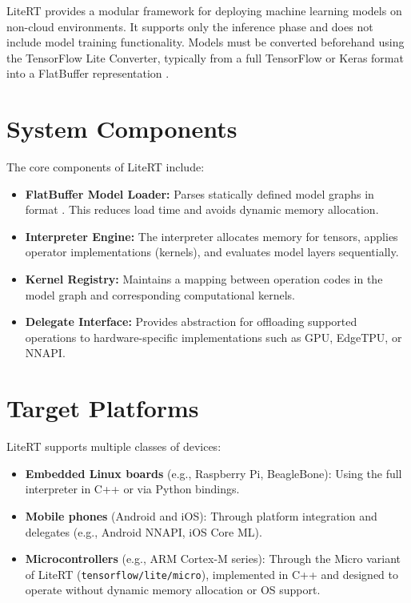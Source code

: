 LiteRT provides a modular framework for deploying machine learning models on non-cloud environments. It supports only the inference phase and does not include model training functionality. Models must be converted beforehand using the TensorFlow Lite Converter, typically from a full TensorFlow  or Keras  format  into a  FlatBuffer representation .



\section{System Components}



The core components of LiteRT include:



\begin{itemize}

	\item \textbf{FlatBuffer Model Loader:} Parses statically defined model graphs in format . This reduces load time and avoids dynamic memory allocation.

	\item \textbf{Interpreter Engine:} The interpreter allocates memory for tensors, applies operator implementations (kernels), and evaluates model layers sequentially.

	\item \textbf{Kernel Registry:} Maintains a mapping between operation codes in the model graph and corresponding computational kernels.

	\item \textbf{Delegate Interface:} Provides abstraction for offloading supported operations to hardware-specific implementations such as GPU, EdgeTPU, or NNAPI.

\end{itemize}



\section{Target Platforms}



LiteRT supports multiple classes of devices:



\begin{itemize}

	\item \textbf{Embedded Linux boards} (e.g., Raspberry Pi, BeagleBone): Using the full interpreter in C++ or via Python bindings.

	\item \textbf{Mobile phones} (Android and iOS): Through platform integration and delegates (e.g., Android NNAPI, iOS Core ML).

	\item \textbf{Microcontrollers} (e.g., ARM Cortex-M series): Through the Micro variant of LiteRT (\texttt{tensorflow/lite/micro}), implemented in C++ and designed to operate without dynamic memory allocation or OS support.

\end{itemize}


